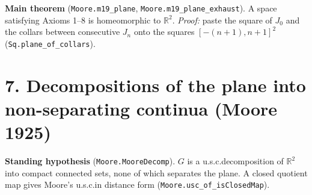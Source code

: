 \documentclass[11pt]{article}
\newcommand{\lean}[1]{\texttt{#1}}
\begin{document}
\textbf{Main theorem} (\lean{Moore.\hspace{0pt}m19\_\hspace{0pt}plane}, \lean{Moore.\hspace{0pt}m19\_\hspace{0pt}plane\_\hspace{0pt}exhaust}). A space satisfying Axioms 1--8 is homeomorphic to $\mathbb{R}^2$. \emph{Proof:} paste the square of $J_0$ and the collars between consecutive $J_n$ onto the squares $[-(n+1), n+1]^2$ (\lean{Sq.\hspace{0pt}plane\_\hspace{0pt}of\_\hspace{0pt}collars}).

\section*{7. Decompositions of the plane into non-separating continua (Moore 1925)}

\textbf{Standing hypothesis} (\lean{Moore.\hspace{0pt}MooreDecomp}). $G$ is a u.s.c.\@ decomposition of $\mathbb{R}^2$ into compact connected sets, none of which separates the plane. A closed quotient map gives Moore's u.s.c.\@ in distance form (\lean{Moore.\hspace{0pt}usc\_\hspace{0pt}of\_\hspace{0pt}isClosedMap}).
\end{document}
